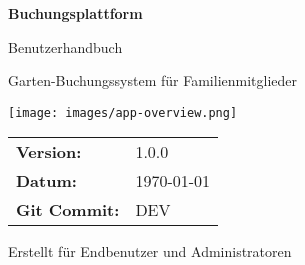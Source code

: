\documentclass[12pt,a4paper]{article}
\newcommand{\documentversion}{1.0.0}
\newcommand{\documentdate}{\today}
\newcommand{\gitcommit}{DEV}
\begin{document}
\begin{titlepage}
    \centering
    \vspace*{2cm}
    
    {\Huge\textbf{\textcolor{primarycolor}{Buchungsplattform}}}
    
    \vspace{0.8cm}
    {\Large\textcolor{secondarycolor}{Benutzerhandbuch}}
    
    \vspace{1.5cm}
    {\large Garten-Buchungssystem für Familienmitglieder}
    
    \vspace{2cm}
    \texttt{[image: images/app-overview.png]}
    
    \vfill
    
    \begin{tabular}{ll}
        \textbf{Version:} & \documentversion \\
        \textbf{Datum:} & \documentdate \\
        \textbf{Git Commit:} & \gitcommit \\
    \end{tabular}
    
    \vspace{1cm}
    
    {\large\textcolor{secondarycolor}{Erstellt für Endbenutzer und Administratoren}}
    
\end{titlepage}

\newpage
\tableofcontents
\newpage








\end{document}
